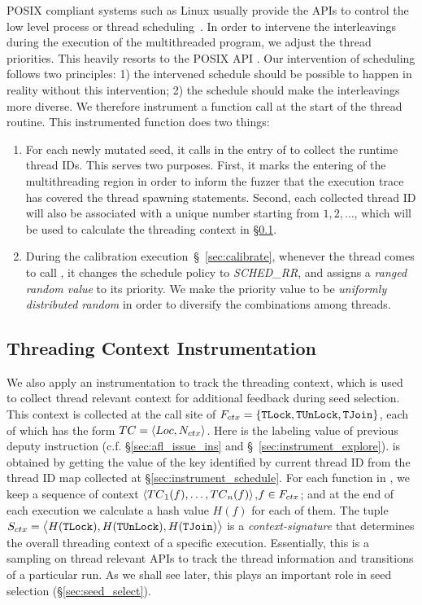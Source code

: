 POSIX compliant systems such as Linux
usually provide the APIs to control the low level process or thread scheduling~\cite{posixstd,tlpi}.
In order to intervene the interleavings during the execution of the multithreaded program, we adjust the thread priorities.
This heavily resorts to the POSIX API . Our intervention of scheduling follows two principles: 1) the intervened schedule should be possible to happen in reality without this intervention; 2) the schedule should make the interleavings more diverse. We therefore instrument a function call \rtifunc at the start of the thread routine. This instrumented function does two things:
\begin{enumerate}[(1)]
    \item For each newly mutated seed, it calls  in the entry of {\FSStart} to collect the runtime thread IDs. This serves two purposes.
    First, it marks the entering of the multithreading region in order to inform the fuzzer that the execution trace has covered the thread spawning statements.
    Second, each collected thread ID will also be associated with a unique number \ntid starting from $1,2,\ldots$, which will be used to calculate the threading context in \S\ref{sec:instrument_thread_ctx}.
    \item During the calibration execution~\S~\ref{sec:calibrate}, whenever the thread comes to call \rtifunc, it changes the schedule policy to \emph{SCHED\_RR}, and assigns a \emph{ranged random value} to its priority.
    We make the priority value to be \emph{uniformly distributed random} in order to diversify the combinations among threads.
\end{enumerate}

\subsection{Threading Context Instrumentation}\label{sec:instrument_thread_ctx}
We also apply an instrumentation to track the threading context, which is used to collect thread relevant context for additional feedback during seed selection.
This context is collected at the call site of $F_{ctx}=\{\texttt{TLock}, \texttt{TUnLock}, \texttt{TJoin}\}$, each of which has the form $TC=\langle Loc, N_{ctx}\rangle$. Here \iloc is the labeling value of previous deputy instruction (c.f. \S\ref{sec:afl_issue_ins} and \S~\ref{sec:instrument_explore}). \ntid is obtained by getting the value of the key identified by current thread ID from the thread ID map collected at \S\ref{sec:instrument_schedule}. For each function in \FSThread, we keep a sequence of context $\langle TC{_1}(f),\ldots,TC{_n}(f)\rangle$,$f\in F_{ctx}$; and at the end of each execution we calculate a hash value $H(f)$ for each of them. The tuple ${S}_{ctx}=\big\langle H(\texttt{TLock}),H(\texttt{TUnLock}),H(\texttt{TJoin})\big\rangle$ is a \emph{context-signature} that determines the overall threading context of a specific execution. Essentially, this is a sampling on thread relevant APIs to track the thread information and transitions of a particular run. As we shall see later, this plays an important role in seed selection (\S\ref{sec:seed_select}).

